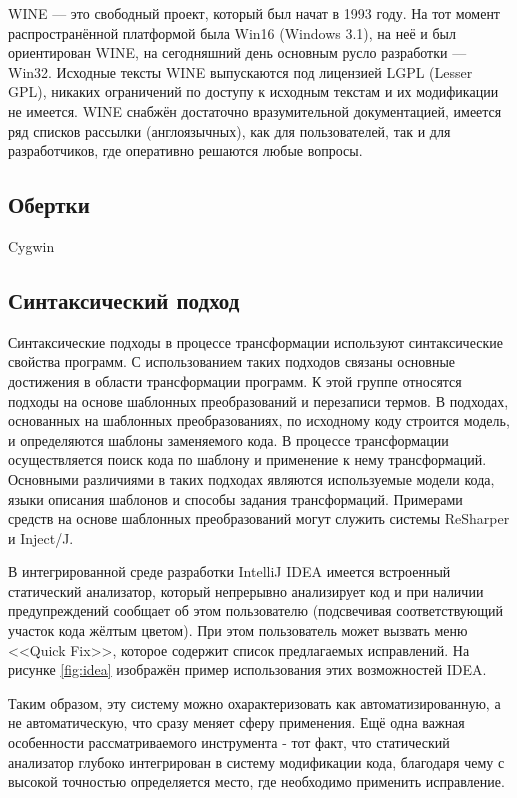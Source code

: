 WINE — это свободный проект, который был начат в 1993 году. На тот момент распространённой платформой была Win16 (Windows 3.1), на неё и был ориентирован WINE, на сегодняшний день основным русло разработки — Win32. Исходные тексты WINE выпускаются под лицензией LGPL (Lesser GPL), никаких ограничений по доступу к исходным текстам и их модификации не имеется. WINE снабжён достаточно вразумительной документацией, имеется ряд списков рассылки (англоязычных), как для пользователей, так и для разработчиков, где оперативно решаются любые вопросы.

\subsection{Обертки}

Cygwin

\subsection{Синтаксический подход}
Синтаксические подходы в процессе трансформации используют синтаксические свойства программ. С использованием таких подходов связаны основные достижения в области трансформации программ. К этой группе относятся подходы на основе шаблонных преобразований и перезаписи термов.
В подходах, основанных на шаблонных преобразованиях, по исходному коду строится модель, и определяются шаблоны заменяемого кода. В процессе трансформации осуществляется поиск кода по шаблону и применение к нему трансформаций. Основными различиями в таких подходах являются используемые модели кода, языки описания шаблонов и способы задания трансформаций. Примерами средств на основе шаблонных преобразований могут служить системы ReSharper и Inject/J.

В интегрированной среде разработки IntelliJ IDEA имеется встроенный статический анализатор\cite{ideaStatic}, который непрерывно анализирует код и при наличии предупреждений сообщает об этом пользователю (подсвечивая соответствующий участок кода жёлтым цветом). При этом пользователь может вызвать меню <<Quick Fix>>, которое содержит список предлагаемых исправлений. На рисунке \ref{fig:idea} изображён пример использования этих возможностей IDEA.

Таким образом, эту систему можно охарактеризовать как автоматизированную, а не автоматическую, что сразу меняет сферу применения. Ещё одна важная особенности рассматриваемого инструмента - тот факт, что статический анализатор глубоко интегрирован в систему модификации кода, благодаря чему с высокой точностью определяется место, где необходимо применить исправление.

